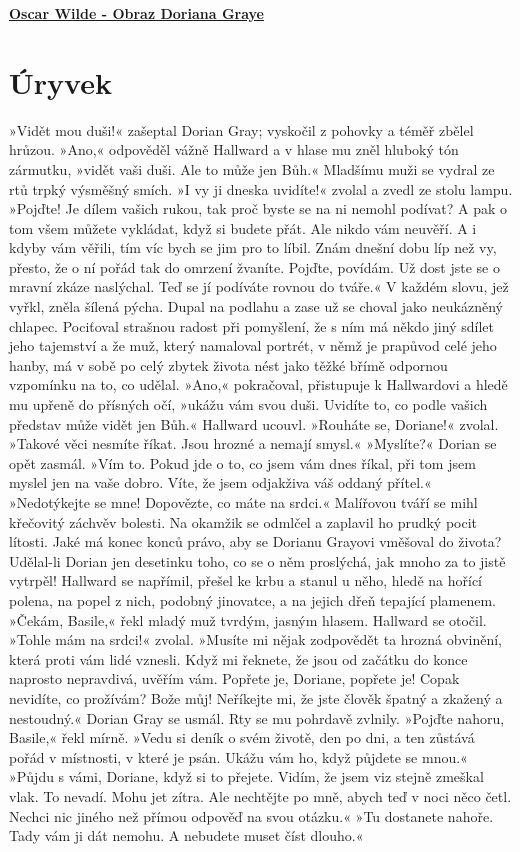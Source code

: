 \documentclass[11pt]{article}
\begin{document}
    \begin{center}
        \underline{\textbf{\Huge Oscar Wilde - Obraz Doriana Graye}}
    \end{center}
    \section*{Úryvek}
    »Vidět mou duši!« zašeptal Dorian Gray; vyskočil z pohovky a téměř zbělel hrůzou.
»Ano,« odpověděl vážně Hallward a v hlase mu zněl hluboký tón zármutku, »vidět vaši
duši. Ale to může jen Bůh.«
Mladšímu muži se vydral ze rtů trpký výsměšný smích. »I vy ji dneska uvidíte!« zvolal a
zvedl ze stolu lampu. »Pojďte! Je dílem vašich rukou, tak proč byste se na ni nemohl podívat?
A pak o tom všem můžete vykládat, když si budete přát. Ale nikdo vám neuvěří. A i kdyby
vám věřili, tím víc bych se jim pro to líbil. Znám dnešní dobu líp než vy, přesto, že o ní pořád
tak do omrzení žvaníte. Pojďte, povídám. Už dost jste se o mravní zkáze naslýchal. Teď se jí
podíváte rovnou do tváře.«
V každém slovu, jež vyřkl, zněla šílená pýcha. Dupal na podlahu a zase už se choval jako
neukázněný chlapec. Pociťoval strašnou radost při pomyšlení, že s ním má někdo jiný sdílet
jeho tajemství a že muž, který namaloval portrét, v němž je prapůvod celé jeho hanby, má v
sobě po celý zbytek života nést jako těžké břímě odpornou vzpomínku na to, co udělal.
»Ano,« pokračoval, přistupuje k Hallwardovi a hledě mu upřeně do přísných očí, »ukážu
vám svou duši. Uvidíte to, co podle vašich představ může vidět jen Bůh.«
Hallward ucouvl. »Rouháte se, Doriane!« zvolal. »Takové věci nesmíte říkat. Jsou hrozné a
nemají smysl.«
»Myslíte?« Dorian se opět zasmál.
»Vím to. Pokud jde o to, co jsem vám dnes říkal, při tom jsem myslel jen na vaše dobro.
Víte, že jsem odjakživa váš oddaný přítel.«
»Nedotýkejte se mne! Dopovězte, co máte na srdci.«
Malířovou tváří se mihl křečovitý záchvěv bolesti. Na okamžik se odmlčel a zaplavil ho
prudký pocit lítosti. Jaké má konec konců právo, aby se Dorianu Grayovi vměšoval do života?
Udělal-li Dorian jen desetinku toho, co se o něm proslýchá, jak mnoho za to jistě vytrpěl!
Hallward se napřímil, přešel ke krbu a stanul u něho, hledě na hořící polena, na popel z nich,
podobný jinovatce, a na jejich dřeň tepající plamenem.
»Čekám, Basile,« řekl mladý muž tvrdým, jasným hlasem.
Hallward se otočil. »Tohle mám na srdci!« zvolal. »Musíte mi nějak zodpovědět ta hrozná
obvinění, která proti vám lidé vznesli. Když mi řeknete, že jsou od začátku do konce naprosto
nepravdivá, uvěřím vám. Popřete je, Doriane, popřete je! Copak nevidíte, co prožívám? Bože
můj! Neříkejte mi, že jste člověk špatný a zkažený a nestoudný.«
Dorian Gray se usmál. Rty se mu pohrdavě zvlnily. »Pojďte nahoru, Basile,« řekl mírně.
»Vedu si deník o svém životě, den po dni, a ten zůstává pořád v místnosti, v které je psán.
Ukážu vám ho, když půjdete se mnou.«
»Půjdu s vámi, Doriane, když si to přejete. Vidím, že jsem viz stejně zmeškal vlak. To
nevadí. Mohu jet zítra. Ale nechtějte po mně, abych teď v noci něco četl. Nechci nic jiného
než přímou odpověď na svou otázku.«
»Tu dostanete nahoře. Tady vám ji dát nemohu. A nebudete muset číst dlouho.«
\end{document}
